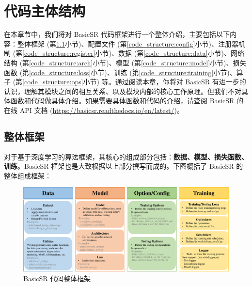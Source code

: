 \documentclass[../main.tex]{subfiles}
\begin{document}
\chapter{代码主体结构}
\vspace{-2cm}

在本章节中，我们将对 BasicSR 代码框架进行一个整体介绍，主要包括以下内容：整体框架 (第\ref{code_structure:overview}小节)、配置文件 (第\ref{code_structure:config}小节)、注册器机制 (第\ref{code_structure:register}小节)、数据 (第\ref{code_structure:data}小节)、网络结构 (第\ref{code_structure:arch}小节)、模型 (第\ref{code_structure:model}小节)、损失函数 (第\ref{code_structure:loss}小节)、训练 (第\ref{code_structure:training}小节)、算子 (第\ref{code_structure:ops}小节) 等。通过阅读本章，你将对 BasicSR 有进一步的认识，理解其模块之间的相互关系、以及模块内部的核心工作原理。但我们不对具体函数和代码做具体介绍。如果需要具体函数和代码的介绍，请查阅 BasicSR 的在线 API 文档 (\url{https://basicsr.readthedocs.io/en/latest/})。

\section{整体框架} \label{code_structure:overview}
对于基于深度学习的算法框架，其核心的组成部分包括：\textbf{数据、模型、损失函数、训练}。BasicSR 框架也是大致根据以上部分撰写而成的。下图概括了 BasicSR 的整体组成框架：

\begin{figure}[htbp]
    \begin{center}
        \includegraphics[width=1\linewidth]{figures/main_framework.pdf}
    \end{center}
    \caption{BasicSR 代码整体框架}
    \label{fig:main_framework}
\end{figure}
\end{document}
